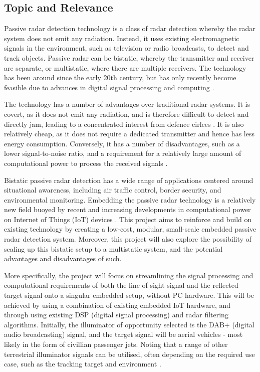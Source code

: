 \documentclass[12pt,a4paper]{article}
\begin{document}
\subsection{Topic and Relevance}
Passive radar detection technology is a class of radar detection whereby the radar system does not emit any radiation. Instead, it uses existing electromagnetic signals in the environment, such as television or radio broadcasts, to detect and track objects. Passive radar can be bistatic, whereby the transmitter and receiver are separate, or multistatic, where there are multiple receivers. The technology has been around since the early 20th century, but has only recently become feasible due to advances in digital signal processing and computing \cite{INTRO2017}.
\par
\vspace{0.5cm} 
\noindent The technology has a number of advantages over traditional radar systems. It is covert, as it does not emit any radiation, and is therefore difficult to detect and directly jam, leading to a concentrated interest from defence cirlces \cite{DTSO2009}. It is also relatively cheap, as it does not require a dedicated transmitter and hence has less energy consumption. Conversely, it has a number of disadvantages, such as a lower signal-to-noise ratio, and a requirement for a relatively large amount of computational power to process the received signals \cite{INTRO2017}.
\par
\vspace{0.5cm} 
\noindent Bistatic passive radar detection has a wide range of applications centered around situational awareness, including air traffic control, border security, and environmental monitoring. Embedding the passive radar technology is a relatively new field buoyed by recent and increasing developments in computational power on Internet of Things (IoT) devices \cite{IOTpassiveRadar}. This project aims to reinforce and build on existing technology by creating a low-cost, modular, small-scale embedded passive radar detection system. Moreover, this project will also explore the possibility of scaling up this bistatic setup to a multistatic system, and the potential advantages and disadvantages of such. 

\par
\vspace{0.5cm} 
\noindent More specifically, the project will focus on streamlining the signal processing and computational requirements of both the line of sight signal and the reflected target signal onto a singular embedded setup, without PC hardware. This will be achieved by using a combination of existing embedded IoT hardware, and through using existing DSP (digital signal processing) and radar filtering algorithms. Initially, the illuminator of opportunity selected is the DAB+ (digital audio broadcasting) signal, and the target signal will be aerial vehicles - most likely in the form of civillian passenger jets. Noting that a range of other terrestrial illuminator signals can be utilised, often depending on the required use case, such as the tracking target and environment \cite{DABsignal}.
\end{document}
